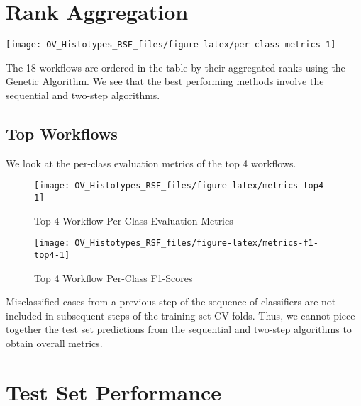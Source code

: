 \documentclass[
]{report}
\begin{document}
\hypertarget{rank-aggregation}{%
\section{Rank Aggregation}\label{rank-aggregation}}

\begin{center}\texttt{[image: OV\_Histotypes\_RSF\_files/figure-latex/per-class-metrics-1]} \end{center}

The 18 workflows are ordered in the table by their aggregated ranks using the Genetic Algorithm. We see that the best performing methods involve the sequential and two-step algorithms.

\hypertarget{top-workflows}{%
\subsection{Top Workflows}\label{top-workflows}}

We look at the per-class evaluation metrics of the top 4 workflows.

\begin{figure}[H]

{\centering \texttt{[image: OV\_Histotypes\_RSF\_files/figure-latex/metrics-top4-1]} 

}

\caption{Top 4 Workflow Per-Class Evaluation Metrics}\label{fig:metrics-top4}
\end{figure}

\begin{figure}[H]

{\centering \texttt{[image: OV\_Histotypes\_RSF\_files/figure-latex/metrics-f1-top4-1]} 

}

\caption{Top 4 Workflow Per-Class F1-Scores}\label{fig:metrics-f1-top4}
\end{figure}

Misclassified cases from a previous step of the sequence of classifiers are not included in subsequent steps of the training set CV folds. Thus, we cannot piece together the test set predictions from the sequential and two-step algorithms to obtain overall metrics.

\hypertarget{test-set-performance}{%
\section{Test Set Performance}\label{test-set-performance}}
\end{document}
